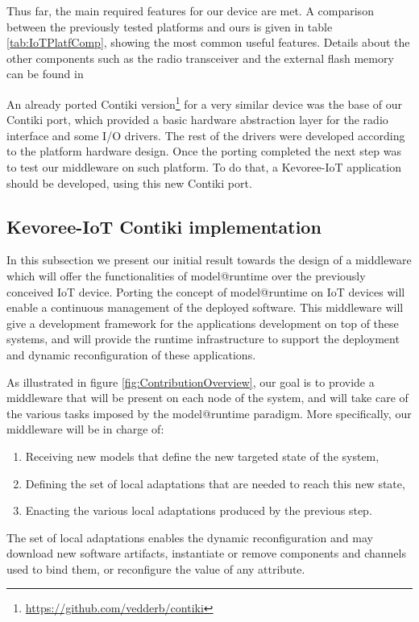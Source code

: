 Thus far, the main required features for our device are met.
A comparison between the previously tested platforms and ours is given in table \ref{tab:IoTPlatfComp}, showing the most common useful features.
Details about the other components such as the radio transceiver and the external flash memory can be found in 
	
An already ported Contiki version\footnote{\url{https://github.com/vedderb/contiki}} for a very similar device was the base of our Contiki port, which provided a basic hardware abstraction layer for the radio interface and some I/O drivers.
The rest of the drivers were developed according to the platform hardware design.
Once the porting completed the next step was to test our middleware on such platform.
To do that, a Kevoree-IoT application should be developed, using this new Contiki port.


\subsection{Kevoree-IoT Contiki implementation}
\label{subsec:kevoreeContikiImpl}
In this subsection we present our initial result towards the design of a middleware which will offer the functionalities of model@runtime over the previously conceived IoT device. 
Porting the concept of model@runtime on IoT devices will enable a continuous management of the deployed software.
This middleware will give a development framework for the  applications development on top of these systems, and will provide the runtime infrastructure to support the deployment and dynamic reconfiguration of these applications.

As illustrated in figure \ref{fig:ContributionOverview}, our goal is to provide a middleware that will be present on each node of the system, and will take care of the various tasks imposed by the model@runtime paradigm.
More specifically, our middleware will be in charge of:
\begin{enumerate}
	\item Receiving new models that define the new targeted state of the system,
	\item Defining the set of local adaptations that are needed to reach this new state,
	\item Enacting the various local adaptations produced by the previous step.
\end{enumerate} 

The set of local adaptations enables the dynamic reconfiguration and may download new software artifacts, instantiate or remove components and channels used to bind them, or reconfigure the value of any attribute.

